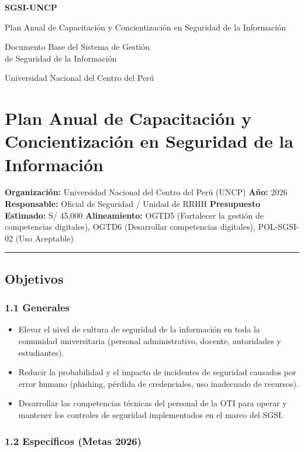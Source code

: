 \documentclass[10pt,letterpaper]{article}
\newcommand{\makecover}{
\begin{titlepage}
\centering
\vspace*{2cm}
{\Huge\bfseries\color{uncpblue} SGSI-UNCP\par}
\vspace{0.7cm}
{\LARGE Plan Anual de Capacitación y Concientización en Seguridad de la
Información\par}
\vspace{0.5cm}
{\large Documento Base del Sistema de Gestión\\de Seguridad de la Información\par}
\vspace{1.5cm}
{\small Universidad Nacional del Centro del Perú\par}
\vfill
\end{titlepage}
}
\begin{document}
\makecover
\setcounter{tocdepth}{2}
\RaggedRight
\tableofcontents
\newpage

\RaggedRight
\section{Plan Anual de Capacitación y Concientización en Seguridad de la
Información}\label{plan-anual-de-capacitaciuxf3n-y-concientizaciuxf3n-en-seguridad-de-la-informaciuxf3n}

\textbf{Organización:} Universidad Nacional del Centro del Perú (UNCP)
\textbf{Año:} 2026 \textbf{Responsable:} Oficial de Seguridad / Unidad
de RRHH \textbf{Presupuesto Estimado:} S/ 45,000 \textbf{Alineamiento:}
OGTD5 (Fortalecer la gestión de competencias digitales), OGTD6
(Desarrollar competencias digitales), POL-SGSI-02 (Uso Aceptable)

\begin{center}\rule{0.5\linewidth}{0.5pt}\end{center}

\subsection{Objetivos}\label{objetivos}

\subsubsection{1.1 Generales}\label{generales}

\begin{itemize}
\tightlist
\item
  Elevar el nivel de cultura de seguridad de la información en toda la
  comunidad universitaria (personal administrativo, docente, autoridades
  y estudiantes).
\item
  Reducir la probabilidad y el impacto de incidentes de seguridad
  causados por error humano (phishing, pérdida de credenciales, uso
  inadecuado de recursos).
\item
  Desarrollar las competencias técnicas del personal de la OTI para
  operar y mantener los controles de seguridad implementados en el marco
  del SGSI.
\end{itemize}

\subsubsection{1.2 Específicos (Metas
2026)}\label{especuxedficos-metas-2026}
\end{document}
